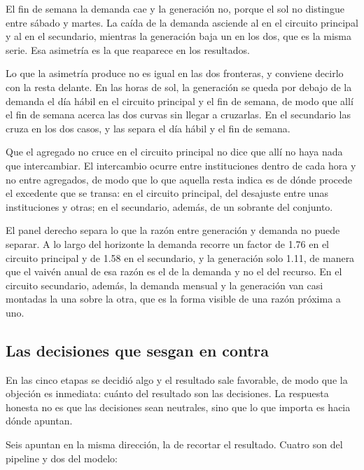 El fin de semana la demanda cae y la generación no, porque el sol no
distingue entre sábado y martes. La caída de la demanda asciende al
 en el circuito principal y al  en el secundario,
mientras la generación baja un  en los dos, que es la misma
serie. Esa asimetría es la que reaparece en los resultados.

Lo que la asimetría produce no es igual en las dos fronteras, y conviene
decirlo con la resta delante. En las horas de sol, la generación se queda
 por debajo de la demanda el día hábil en el circuito
principal y  el fin de semana, de modo que allí el fin de
semana acerca las dos curvas sin llegar a cruzarlas. En el secundario las
cruza en los dos casos, y las separa  el día hábil y
 el fin de semana.

Que el agregado no cruce en el circuito principal no dice que allí no haya
nada que intercambiar. El intercambio ocurre entre instituciones dentro de
cada hora y no entre agregados, de modo que lo que aquella resta indica es
de dónde procede el excedente que se transa: en el circuito principal, del
desajuste entre unas instituciones y otras; en el secundario, además, de
un sobrante del conjunto.

El panel derecho separa lo que la razón entre generación y demanda no
puede separar. A lo largo del horizonte la demanda recorre un factor de
\num{1,76} en el circuito principal y de \num{1,58} en el secundario, y la
generación solo \num{1,11}, de manera que el vaivén anual de esa razón es
el de la demanda y no el del recurso. En el circuito secundario, además,
la demanda mensual y la generación van casi montadas la una sobre la otra,
que es la forma visible de una razón próxima a uno.

\subsection{Las decisiones que sesgan en contra}
\label{sub:prep-sesgo}

En las cinco etapas se decidió algo y el resultado sale favorable, de modo
que la objeción es inmediata: cuánto del resultado son las decisiones. La
respuesta honesta no es que las decisiones sean neutrales, sino que lo que
importa es hacia dónde apuntan.

Seis apuntan en la misma dirección, la de recortar el resultado. Cuatro son
del pipeline y dos del modelo:

